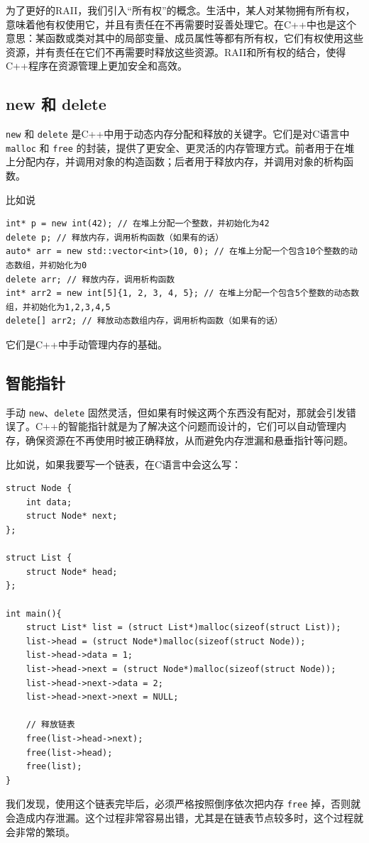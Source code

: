 为了更好的RAII，我们引入“所有权”的概念。生活中，某人对某物拥有所有权，意味着他有权使用它，并且有责任在不再需要时妥善处理它。在C++中也是这个意思：某函数或类对其中的局部变量、成员属性等都有所有权，它们有权使用这些资源，并有责任在它们不再需要时释放这些资源。RAII和所有权的结合，使得C++程序在资源管理上更加安全和高效。

\subsection{new 和 delete}

\verb|new| 和 \verb|delete| 是C++中用于动态内存分配和释放的关键字。它们是对C语言中 \verb|malloc| 和 \verb|free| 的封装，提供了更安全、更灵活的内存管理方式。前者用于在堆上分配内存，并调用对象的构造函数；后者用于释放内存，并调用对象的析构函数。

比如说
\begin{verbatim}
int* p = new int(42); // 在堆上分配一个整数，并初始化为42
delete p; // 释放内存，调用析构函数（如果有的话）
auto* arr = new std::vector<int>(10, 0); // 在堆上分配一个包含10个整数的动态数组，并初始化为0
delete arr; // 释放内存，调用析构函数
int* arr2 = new int[5]{1, 2, 3, 4, 5}; // 在堆上分配一个包含5个整数的动态数组，并初始化为1,2,3,4,5
delete[] arr2; // 释放动态数组内存，调用析构函数（如果有的话）
\end{verbatim}
它们是C++中手动管理内存的基础。

\subsection{智能指针}

手动 \verb|new|、\verb|delete| 固然灵活，但如果有时候这两个东西没有配对，那就会引发错误了。C++的智能指针就是为了解决这个问题而设计的，它们可以自动管理内存，确保资源在不再使用时被正确释放，从而避免内存泄漏和悬垂指针等问题。

比如说，如果我要写一个链表，在C语言中会这么写：
\begin{verbatim}
struct Node {
    int data;
    struct Node* next;
};

struct List {
    struct Node* head;
};

int main(){
    struct List* list = (struct List*)malloc(sizeof(struct List));
    list->head = (struct Node*)malloc(sizeof(struct Node));
    list->head->data = 1;
    list->head->next = (struct Node*)malloc(sizeof(struct Node));
    list->head->next->data = 2;
    list->head->next->next = NULL;

    // 释放链表
    free(list->head->next);
    free(list->head);
    free(list);
}

\end{verbatim}
我们发现，使用这个链表完毕后，必须严格按照倒序依次把内存 \verb|free| 掉，否则就会造成内存泄漏。这个过程非常容易出错，尤其是在链表节点较多时，这个过程就会非常的繁琐。


